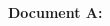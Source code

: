 \documentclass{report}
\begin{document}
\begin{spacing}{1.4}
\begin{enumerate}[leftmargin=*]
    \newpage

    \textbf{Document A:}
    


\end{enumerate}
\end{spacing}
\end{document}
